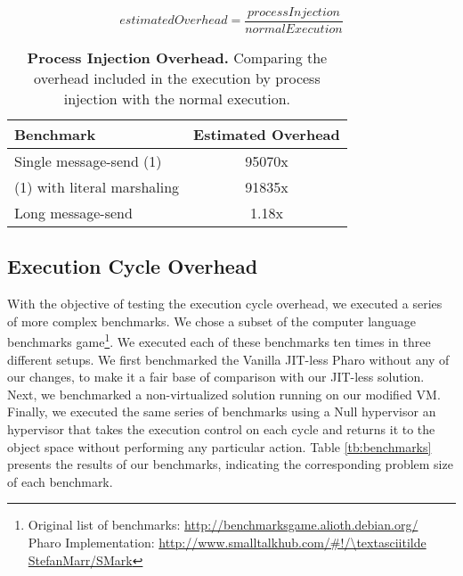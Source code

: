 \begin{equation*}
estimatedOverhead = \frac{processInjection}{normalExecution}
\end{equation*}

\begin{table}[ht]
 	\centering
 	\begin{tabular}{lc}
			\toprule
			\textbf{Benchmark}
 			& \textbf{Estimated Overhead}\\
		\midrule
		Single message-send (1) & 95070x \\\midrule
		(1) with literal marshaling & 91835x \\\midrule
		Long message-send & 1.18x  \\\midrule
 	\end{tabular}
	\vspace*{0.2cm}
 	\caption{\textbf{Process Injection Overhead.} Comparing the overhead included in the execution by process injection with the normal execution.\label{tb:benchmarks_injection_comparison}}
 \end{table}

\subsection{Execution Cycle Overhead}
With the objective of testing the execution cycle overhead, we executed a series of more complex benchmarks. We chose a subset of the computer language benchmarks game\footnote{Original list of benchmarks: \url{http://benchmarksgame.alioth.debian.org/}\\Pharo Implementation: \url{http://www.smalltalkhub.com/\#!/\textasciitilde StefanMarr/SMark}}. We executed each of these benchmarks ten times in three different setups. We first benchmarked the Vanilla JIT-less Pharo \VM without any of our changes, to make it a fair base of comparison with our JIT-less solution. Next, we benchmarked a non-virtualized solution running on our modified VM. Finally, we executed the same series of benchmarks using a Null hypervisor \ie an hypervisor that takes the execution control on each cycle and returns it to the object space without performing any particular action. Table \ref{tb:benchmarks} presents the results of our benchmarks, indicating the corresponding problem size of each benchmark.


